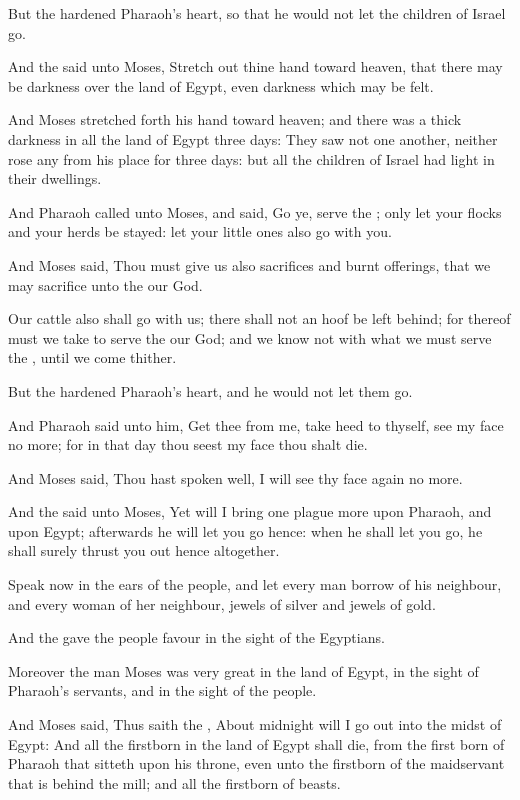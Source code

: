 \Verse But the \LORD hardened Pharaoh's heart, so that he would not let the children of Israel go.

\Verse And the \LORD said unto Moses, Stretch out thine hand toward heaven, that there may be darkness over the land of Egypt, even darkness which may be felt.

\Verse And Moses stretched forth his hand toward heaven; and there was a thick darkness in all the land of Egypt three days: \Verse They saw not one another, neither rose any from his place for three days: but all the children of Israel had light in their dwellings.

\Verse And Pharaoh called unto Moses, and said, Go ye, serve the \LORD; only let your flocks and your herds be stayed: let your little ones also go with you.

\Verse And Moses said, Thou must give us also sacrifices and burnt offerings, that we may sacrifice unto the \LORD our God.

\Verse Our cattle also shall go with us; there shall not an hoof be left behind; for thereof must we take to serve the \LORD our God; and we know not with what we must serve the \LORD, until we come thither.

\Verse But the \LORD hardened Pharaoh's heart, and he would not let them go.

\Verse And Pharaoh said unto him, Get thee from me, take heed to thyself, see my face no more; for in that day thou seest my face thou shalt die.

\Verse And Moses said, Thou hast spoken well, I will see thy face again no more.

\Chapter
\Verse And the \LORD said unto Moses, Yet will I bring one plague more upon Pharaoh, and upon Egypt; afterwards he will let you go hence: when he shall let you go, he shall surely thrust you out hence altogether.

\Verse Speak now in the ears of the people, and let every man borrow of his neighbour, and every woman of her neighbour, jewels of silver and jewels of gold.

\Verse And the \LORD gave the people favour in the sight of the Egyptians.

Moreover the man Moses was very great in the land of Egypt, in the sight of Pharaoh's servants, and in the sight of the people.

\Verse And Moses said, Thus saith the \LORD, About midnight will I go out into the midst of Egypt: \Verse And all the firstborn in the land of Egypt shall die, from the first born of Pharaoh that sitteth upon his throne, even unto the firstborn of the maidservant that is behind the mill; and all the firstborn of beasts.

